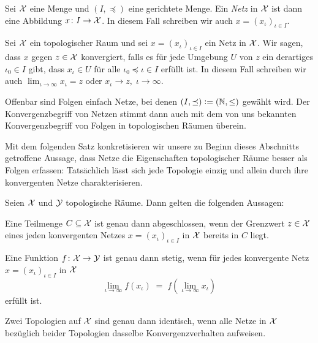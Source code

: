 \documentclass[../main/main.tex]{subfiles}
\begin{document}
	\begin{Definition}[Netz]
		\label{def:netz}
		Sei $\mathcal{X}$ eine Menge und $(I, \preceq)$ eine gerichtete Menge. Ein \emph{Netz} in $\mathcal{X}$ ist dann eine Abbildung $x \colon I \to \mathcal{X}$. In diesem
		Fall schreiben wir auch $x = (x_\iota)_{\iota \in I}$.
	\end{Definition}
	
	\begin{Definition}
		Sei $\mathcal{X}$ ein topologischer Raum und sei $x = (x_\iota)_{\iota \in I}$ ein Netz in $\mathcal{X}$. Wir sagen, dass $x$ gegen $z \in \mathcal{X}$ konvergiert, falls
		es für jede Umgebung $U$ von $z$ ein derartiges $\iota_0 \in I$ gibt, dass $x_\iota \in U$ für alle $\iota_0 \preceq \iota \in I$ erfüllt ist.
		In diesem Fall schreiben wir auch $\lim_{\iota \to \infty} x_\iota = z$ oder $x_\iota \to z, \; \iota \to \infty$.
	\end{Definition}
	
	\begin{Bemerkung}
		Offenbar sind Folgen einfach Netze, bei denen $(I, \preceq) \vcentcolon = (\mathbb{N}, \leq)$ gewählt wird. Der Konvergenzbegriff von Netzen stimmt
		dann auch mit dem von uns bekannten Konvergenzbegriff von Folgen in topologischen Räumen überein.
	\end{Bemerkung}
	
	Mit dem folgenden Satz konkretisieren wir unsere zu Beginn dieses Abschnitts getroffene Aussage, dass Netze die Eigenschaften topologischer Räume
	besser als Folgen erfassen: Tatsächlich lässt sich jede Topologie einzig und allein durch ihre konvergenten Netze charakterisieren.
	
	\begin{Satz}
		\label{satz:netz_konvergenz}
		Seien $\mathcal{X}$ und $\mathcal{Y}$ topologische Räume. Dann gelten die folgenden Aussagen:
		\begin{enumeratethm}
			\item Eine Teilmenge $C \subseteq \mathcal{X}$ ist genau dann abgeschlossen, wenn der Grenzwert $z \in \mathcal{X}$ eines jeden konvergenten Netzes 
			$x = (x_\iota)_{\iota \in I}$ in $\mathcal{X}$ bereits in $C$ liegt.
			\item Eine Funktion $f \colon \mathcal{X} \to \mathcal{Y}$ ist genau dann stetig, wenn für jedes konvergente Netz $x = (x_\iota)_{\iota \in I}$ in $\mathcal{X}$ 
			\[ \lim_{\iota \to \infty} f(x_\iota) \; = \; f(\lim_{\iota \to \infty} x_\iota) \]
			erfüllt ist.
			\item Zwei Topologien auf $\mathcal{X}$ sind genau dann identisch, wenn alle Netze in $\mathcal{X}$ bezüglich beider Topologien dasselbe Konvergenzverhalten aufweisen.
		\end{enumeratethm}
	\end{Satz}
	
\end{document}
